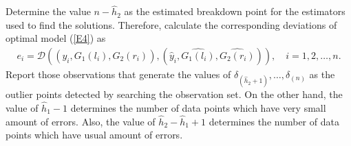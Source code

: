 \documentclass{IJFS}
\begin{document}
Determine the value  $n-\widehat{h}_2$ as the estimated breakdown point for the estimators used to find the solutions.
Therefore, calculate the corresponding deviations of optimal model (\ref{E4}) as
\begin{eqnarray*}
e_i=\mathcal{D}\left((y_i,G_1(l_i),G_2(r_i)),(\widehat{y}_i,\widehat{G_1(l_i)},\widehat{G_2(r_i)})\right), \quad i = 1, 2,\ldots, n.
\end{eqnarray*}
Report those observations that generate the values of $\delta_{(\widehat{h}_2+1)},\ldots, \delta_{(n)}$ as the outlier points detected by searching the observation set.
On the other hand, the value of $\widehat{h}_1-1$ determines the number of data points which have very small amount of errors.
Also, the value of $\widehat{h}_2-\widehat{h}_1+1$ determines the number of data points which have usual amount of errors.
\end{document}
